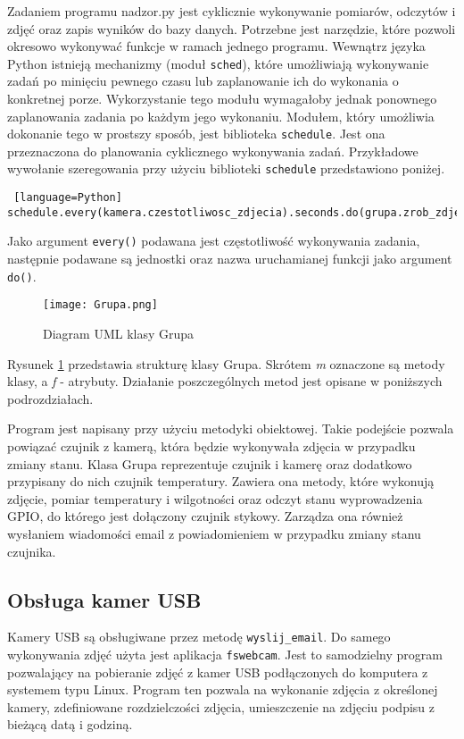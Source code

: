 \documentclass[a4paper,11pt,twoside]{article}
\begin{document}
Zadaniem programu nadzor.py jest cyklicznie wykonywanie pomiarów, odczytów i zdjęć oraz zapis wyników do bazy danych. Potrzebne jest narzędzie, które pozwoli okresowo wykonywać funkcje w ramach jednego programu. Wewnątrz języka Python istnieją mechanizmy (moduł \texttt{sched}), które umożliwiają wykonywanie zadań po minięciu pewnego czasu lub zaplanowanie ich do wykonania o konkretnej porze. Wykorzystanie tego modułu wymagałoby jednak ponownego zaplanowania zadania po każdym jego wykonaniu. Modułem, który umożliwia dokonanie tego w prostszy sposób, jest biblioteka \texttt{schedule}. Jest ona przeznaczona do planowania cyklicznego wykonywania zadań. Przykładowe wywołanie szeregowania przy użyciu biblioteki \texttt{schedule} przedstawiono poniżej.
\begin{lstlisting} [language=Python]
schedule.every(kamera.czestotliwosc_zdjecia).seconds.do(grupa.zrob_zdjecie)
\end{lstlisting}
Jako argument \texttt{every()} podawana jest częstotliwość wykonywania zadania, następnie podawane są jednostki oraz nazwa uruchamianej funkcji jako argument \texttt{do()}.

\begin{figure}[H]
\begin{center}
\texttt{[image: Grupa.png]}
\caption{Diagram UML klasy Grupa}
\label{fig: Grupa}
\end{center}
\end{figure}

Rysunek \ref{fig: Grupa} przedstawia strukturę klasy Grupa. Skrótem \textit{m} oznaczone są metody klasy, a \textit{f} - atrybuty. Działanie poszczególnych metod jest opisane w poniższych podrozdziałach. 

Program jest napisany przy użyciu metodyki obiektowej. Takie podejście pozwala powiązać czujnik z kamerą, która będzie wykonywała zdjęcia w przypadku zmiany stanu. Klasa Grupa reprezentuje czujnik i kamerę oraz dodatkowo przypisany do nich czujnik temperatury. Zawiera ona metody, które wykonują zdjęcie, pomiar temperatury i wilgotności oraz odczyt stanu wyprowadzenia GPIO, do którego jest dołączony czujnik stykowy. Zarządza ona również wysłaniem wiadomości email z powiadomieniem w przypadku zmiany stanu czujnika.

\subsection{Obsługa kamer USB}
Kamery USB są obsługiwane przez metodę \texttt{wyslij{\_}email}. Do samego wykonywania zdjęć użyta jest aplikacja \texttt{fswebcam}. Jest to samodzielny program pozwalający na pobieranie zdjęć z kamer USB podłączonych do komputera z systemem typu Linux. Program ten pozwala na wykonanie zdjęcia z określonej kamery, zdefiniowane rozdzielczości zdjęcia, umieszczenie na zdjęciu podpisu z bieżącą datą i godziną. 
\end{document}
